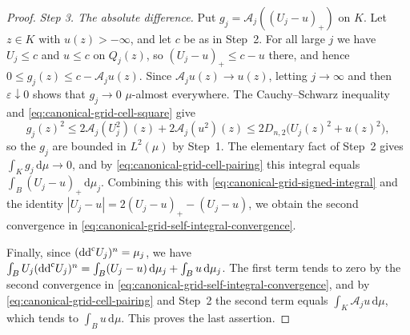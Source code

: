 \begin{proof}
\emph{Step 3. The absolute difference.}
Put $g_j=\mathcal A_j((U_j-u)_+)$ on $K$. Let $z\in K$ with $u(z)>-\infty$, and let $c$ be as in Step~2. For all large $j$ we have $U_j\le c$ and $u\le c$ on $Q_j(z)$, so $(U_j-u)_+\le c-u$ there, and hence $0\le g_j(z)\le c-\mathcal A_ju(z)$. Since $\mathcal A_ju(z)\to u(z)$, letting $j\to\infty$ and then $\varepsilon\downarrow0$ shows that $g_j\to0$ $\mu$-almost everywhere. The Cauchy--Schwarz inequality and \eqref{eq:canonical-grid-cell-square} give
\[
 g_j(z)^2\leq2\mathcal A_j(U_j^2)(z)
                  +2\mathcal A_j(u^2)(z)
 \leq2D_{n,2}\bigl(U_j(z)^2+u(z)^2\bigr),
\]
so the $g_j$ are bounded in $L^2(\mu)$ by Step~1. The elementary fact of Step~2 gives $\int_Kg_j\,\mathrm d\mu\to0$, and by \eqref{eq:canonical-grid-cell-pairing} this integral equals $\int_B(U_j-u)_+\,\mathrm d\mu_j$. Combining this with \eqref{eq:canonical-grid-signed-integral} and the identity $|U_j-u|=2(U_j-u)_+-(U_j-u)$, we obtain the second convergence in \eqref{eq:canonical-grid-self-integral-convergence}.

Finally, since $(\mathrm{dd}^{\mathrm{c}} U_j)^n=\mu_j$, we have $\int_BU_j(\mathrm{dd}^{\mathrm{c}} U_j)^n=\int_B(U_j-u)\,\mathrm d\mu_j+\int_Bu\,\mathrm d\mu_j$. The first term tends to zero by the second convergence in \eqref{eq:canonical-grid-self-integral-convergence}, and by \eqref{eq:canonical-grid-cell-pairing} and Step~2 the second term equals $\int_K\mathcal A_ju\,\mathrm d\mu$, which tends to $\int_Bu\,\mathrm d\mu$. This proves the last assertion.
\end{proof}
